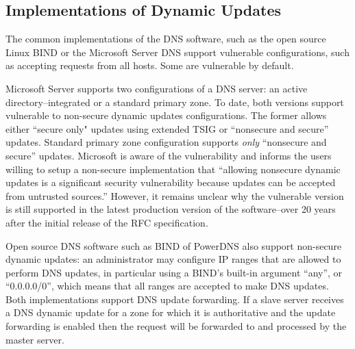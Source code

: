 \subsection{Implementations of Dynamic Updates}

The common implementations of the DNS software, such as the open source Linux BIND \cite{bind} or the Microsoft Server DNS support vulnerable configurations, such as accepting requests from all hosts.
Some are vulnerable by default.

Microsoft Server supports two configurations of a DNS server: an active directory--integrated or a standard primary zone.
To date, both versions support vulnerable to %
non-secure dynamic updates configurations.
The former allows either ``secure only" updates using extended TSIG or ``nonsecure and secure'' updates. %
Standard primary zone configuration supports \textit{only} ``nonsecure and secure''  updates.
Microsoft is aware of the vulnerability and informs the users willing to setup a non-secure implementation that ``allowing nonsecure dynamic updates is a significant security vulnerability because updates can be accepted from untrusted sources.''
However, it remains unclear why the vulnerable version is still supported in the latest production version of the software--over 20 years after the initial release of the RFC specification.

Open source DNS software such as BIND of PowerDNS also support non-secure dynamic updates: an administrator may configure IP ranges that are allowed to perform DNS updates, in particular  using a BIND's built-in argument ``any'', or ``0.0.0.0/0'', which means that all ranges are accepted to make DNS updates. 
Both implementations support DNS update forwarding.  
If a slave server receives a DNS dynamic update for a zone for which it is authoritative and the update forwarding is enabled then the request will be forwarded to and processed by the master server.

